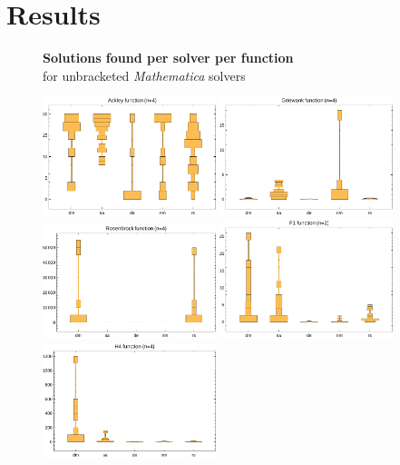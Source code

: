 \documentclass[12pt]{article}
\begin{document}
\section{Results}
\begin{figure}[H]
    \begin{center}
        {\large {\bfseries Solutions found per solver per function}\\
        for unbracketed \emph{Mathematica} solvers}

        \includegraphics[width=0.45\textwidth]{../figures/ackley-fun-bad.pdf}
        \includegraphics[width=0.45\textwidth]{../figures/griewank-fun-bad.pdf}
        \includegraphics[width=0.45\textwidth]{../figures/rosenbrock-fun-bad.pdf}
        \includegraphics[width=0.45\textwidth]{../figures/f1-fun-bad.pdf}
        \includegraphics[width=0.45\textwidth]{../figures/h4-fun-bad.pdf}


\end{center}
\end{figure}
\end{document}
